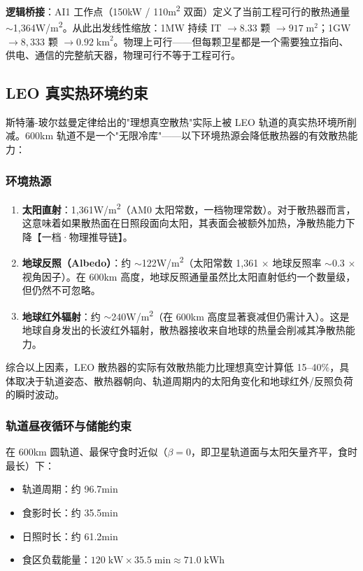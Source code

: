 \textbf{逻辑桥接}：AI1 工作点（150\;kW / 110\;m\textsuperscript{2} 双面）定义了当前工程可行的散热通量 $\sim$1,364\;W/m\textsuperscript{2}。从此出发线性缩放：1\;MW 持续 IT $\rightarrow 8.33$ 颗 $\rightarrow 917\;\text{m}^2$；1\;GW $\rightarrow 8,333$ 颗 $\rightarrow 0.92\;\text{km}^2$。物理上可行——但每颗卫星都是一个需要独立指向、供电、通信的完整航天器，物理可行不等于工程可行。

\subsection{LEO 真实热环境约束}

斯特藩-玻尔兹曼定律给出的"理想真空散热"实际上被 LEO 轨道的真实热环境所削减。600\;km 轨道不是一个"无限冷库"——以下环境热源会降低散热器的有效散热能力：

\subsubsection{环境热源}

\begin{enumerate}[leftmargin=*]
    \item \textbf{太阳直射}：1,361\;W/m\textsuperscript{2}（AM0 太阳常数，一档物理常数）。对于散热器而言，这意味着如果散热面在日照段面向太阳，其表面会被额外加热，净散热能力下降【一档·物理推导链】。
    \item \textbf{地球反照（Albedo）}：约 $\sim$122\;W/m\textsuperscript{2}（太阳常数 1,361 $\times$ 地球反照率 $\sim$0.3 $\times$ 视角因子）。在 600\;km 高度，地球反照通量虽然比太阳直射低约一个数量级，但仍然不可忽略。
    \item \textbf{地球红外辐射}：约 $\sim$240\;W/m\textsuperscript{2}（在 600\;km 高度显著衰减但仍需计入）。这是地球自身发出的长波红外辐射，散热器接收来自地球的热量会削减其净散热能力\cite{clawson2002thermal,nasa2021tm4527}。
\end{enumerate}

综合以上因素，LEO 散热器的实际有效散热能力比理想真空计算低 15--40\%，具体取决于轨道姿态、散热器朝向、轨道周期内的太阳角变化和地球红外/反照负荷的瞬时波动。

\subsubsection{轨道昼夜循环与储能约束}

在 600\;km 圆轨道、最保守食时近似（$\beta = 0$，即卫星轨道面与太阳矢量齐平，食时最长）下：

\begin{itemize}[leftmargin=*]
    \item 轨道周期：约 96.7\;min
    \item 食影时长：约 35.5\;min
    \item 日照时长：约 61.2\;min
    \item 食区负载能量：$120\;\text{kW} \times 35.5\;\text{min} \approx 71.0\;\text{kWh}$
\end{itemize}

